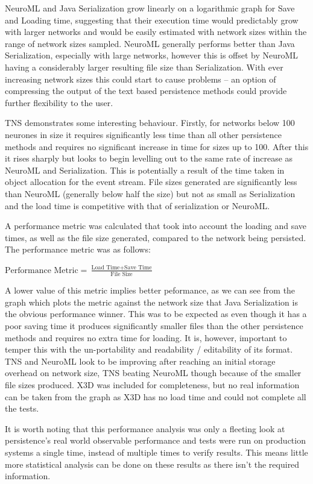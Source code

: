 \documentclass{acm_proc_article-sp}
\begin{document}
{NeuroML and Java Serialization grow linearly on a logarithmic graph for Save
and Loading time, suggesting that their execution time would predictably
grow with larger networks and would be easily estimated with network
sizes within the range of network sizes sampled. NeuroML generally
performs better than Java Serialization, especially with large networks,
however this is offset by NeuroML having a considerably larger
resulting file size than Serialization. With ever increasing network sizes this could start to cause problems {--} an option of compressing the output of the text based persistence methods could provide further flexibility to the user.

TNS demonstrates some interesting behaviour. Firstly, for networks below 100 neurones in size it requires significantly less time than all other persistence methods and requires no significant increase in time for sizes up to 100. After this it rises sharply but looks to begin levelling out to the same rate of increase as NeuroML and Serialization. This is potentially a result of the time taken in object allocation for the event stream. File sizes generated are significantly less than NeuroML (generally below half the size) but not as small as Serialization and the load time is competitive with that of serialization or NeuroML.

A performance metric was calculated that took into account the loading
and save times, as well as the file size generated, compared to the
network being persisted. The performance metric was as follows:

$\text{Performance Metric}=\frac{\text{Load Time}+\text{Save
Time}}{\text{File Size}}$

A lower value of this metric implies better peformance, as we can see from the graph which plots the metric against the network size that Java Serialization is the obvious performance winner. This was to be expected as even though it has a poor saving time it produces significantly smaller files than the other persistence methods and requires no extra time for loading. It is, however, important to temper this with the un-portability and readability / editability of its format. TNS and NeuroML look to be improving after reaching an initial storage overhead on network size, TNS beating NeuroML though because of the smaller file sizes produced. X3D was included for completeness, but no real information can be taken from the graph as X3D has no load time and could not complete all the tests.

It is worth noting that this performance analysis was only a fleeting look at persistence's real world observable performance and tests were run on production systems a single time, instead of multiple times to verify results. This means little more statistical analysis can be done on these results as there isn't the required information.
}
\end{document}
